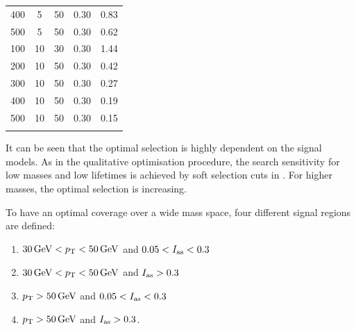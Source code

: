 \begin{table}[!h]
{\begin{tabular}{c |c| c| c| c}
400&                          5&                            50&                           0.30&                         0.83\\
500&                          5&                            50&                           0.30&                         0.62\\
100&                          10&                           30&                           0.30&                         1.44\\
200&                          10&                           50&                           0.30&                         0.42\\
300&                          10&                           50&                           0.30&                         0.27\\
400&                          10&                           50&                           0.30&                         0.19\\
500&                          10&                           50&                           0.30&                         0.15\\
\bottomrule
\multicolumn{5}{c}{} \\
\end{tabular}}
\end{table}

It can be seen that the optimal selection is highly dependent on the signal models.
As in the qualitative optimisation procedure, the search sensitivity for low masses and low lifetimes is achieved by soft selection cuts in \pt.
For higher masses, the optimal \ias selection is increasing.

To have an optimal coverage over a wide mass space, four different signal regions are defined:
\begin{enumerate}[1.)]
\item $30\,\text{Ge}\kern-0.06667em\text{V}<p_{\text{T}}<50\,\text{Ge}\kern-0.06667em\text{V}$ and $0.05<I_{\text{as}}<0.3$
\item $30\,\text{Ge}\kern-0.06667em\text{V}<p_{\text{T}}<50\,\text{Ge}\kern-0.06667em\text{V}$ and $I_{\text{as}}>0.3$
\item $p_{\text{T}}>50\,\text{Ge}\kern-0.06667em\text{V}$ and $0.05<I_{\text{as}}<0.3$
\item $p_{\text{T}}>50\,\text{Ge}\kern-0.06667em\text{V}$ and $I_{\text{as}}>0.3$.\\
\end{enumerate}

